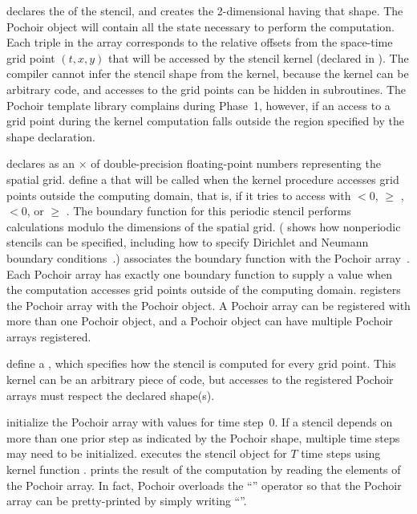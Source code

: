  declares the  of the
stencil, and  creates the 2-dimensional
  having that shape.  The Pochoir
object will contain all the state necessary to perform the
computation.  Each triple in the array  corresponds
to the relative offsets from the space-time grid point $(t, x, y)$
that will be accessed by the stencil kernel (declared in
).  The compiler cannot
infer the stencil shape from the kernel, because the kernel can be
arbitrary code, and accesses to the grid points can be hidden in
subroutines.  The Pochoir template library complains during Phase~1,
however, if an access to a grid point during the kernel computation
falls outside the region specified by the shape declaration.

 declares  as an
$\times$  of double-precision
floating-point numbers representing the spatial grid.
 define a
 that will be called when the kernel procedure
accesses grid points outside the computing domain, that is, if it
tries to access  with  $<0$,  $\geq$
,  $<0$, or  $\geq$ .  The boundary
function for this periodic stencil performs calculations modulo the
dimensions of the spatial grid.  ( shows how nonperiodic
stencils can be specified, including how to specify Dirichlet and
Neumann boundary conditions~\cite{FeshbachMo81}.)
 associates the boundary function 
with the Pochoir array~.  Each Pochoir array has exactly one
boundary function to supply a value when the computation accesses grid
points outside of the computing domain.  
registers the Pochoir array  with the  Pochoir
object.  A Pochoir array can be registered with more than one Pochoir
object, and a Pochoir object can have multiple Pochoir arrays
registered.

 define a  , which specifies how the stencil is
computed for every grid point.  This kernel can be an arbitrary piece
of code, but accesses to the registered Pochoir arrays must respect
the declared shape(s).

 initialize the Pochoir array
 with values for time step~$0$.  If a stencil depends on more
than one prior step as indicated by the Pochoir shape, multiple time
steps may need to be initialized.   executes the
stencil object  for $T$ time steps using kernel function
.   prints the
result of the computation by reading the elements  of
the Pochoir array.  In fact, Pochoir overloads the ``\code{<<}''
operator so that the Pochoir array can be pretty-printed by simply
writing ``''.

